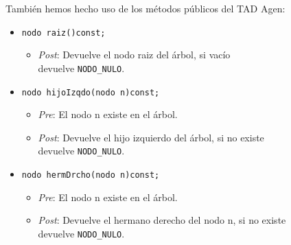 También hemos hecho uso de los métodos públicos del TAD Agen:
\begin{itemize}
  \item \verb |nodo raiz()const;|
  \begin{itemize}
    \item \textit{Post}: Devuelve el nodo raiz del árbol, si vacío\\ devuelve \texttt{NODO\_NULO}.
  \end{itemize}
  \item \verb |nodo hijoIzqdo(nodo n)const;|
  \begin{itemize}
    \item \textit{Pre}: El nodo n existe en el árbol.
    \item \textit{Post}: Devuelve el hijo izquierdo del árbol, si no existe\\ devuelve \texttt{NODO\_NULO}.
  \end{itemize}
  \item \verb |nodo hermDrcho(nodo n)const;|
  \begin{itemize}
    \item \textit{Pre}: El nodo n existe en el árbol.
    \item \textit{Post}: Devuelve el hermano derecho del nodo n, si no existe\\ devuelve \texttt{NODO\_NULO}.
  \end{itemize}
\end{itemize}

